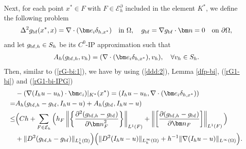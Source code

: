 \documentclass[1996/10/24]{amsart}
\theoremstyle{definition}
\numberwithin{equation}{section}
\begin{document}
Next, for each point $x^{\ast}\in F$ with $F\in \mathcal{E}_h^{\partial}$ included in the element $K^{\ast}$, we define the following problem
\begin{align}
\Delta^2g_{{\rm bf}}(x^{\ast},x)=\nabla\cdot({\bm e}_i\delta_{h,x^{\ast}})\quad {\rm in}~\Omega,\quad g_{{\rm bf}}=\nabla g_{{\rm bf}}\cdot{\bm n}=0\quad {\rm on}~\partial\Omega,\label{rG1-bi}
\end{align}
and let $g_{{\rm bf},h}\in S_h$ be its $C^0$-IP approximation such that
\begin{align}
A_h(g_{{\rm bf},h},v_h)=(\nabla\cdot({\bm e}_i\delta_{h,x^{\ast}}),v_h),\quad \forall v_h\in S_h.\label{rG1-bi-IPG}
\end{align}
Then, similar to (\ref{rG-bi:1}), we have by using (\ref{ddd:2}), Lemma \ref{dfp-bi}, (\ref{rG1-bi}) and (\ref{rG1-bi-IPG})
\begin{align}
&-(\nabla (I_hu-u_h)\cdot{\bm e}_i)|_{K^{\ast}}(x^{\ast})=(I_hu-u_h,\nabla\cdot({\bm e}_i\delta_{h,x^{\ast}}))\nonumber\\
=&A_h(g_{{\rm bf},h}-g_{{\rm bf}},I_hu-u)+A_h(g_{{\rm bf}},I_hu-u)\label{rG1-bi:1}\\
\leq&\Big(Ch+\sum_{F\in\mathcal{E}_h}\Big(h_F\left\|\left\{\frac{\partial^2(g_{{\rm bf},h}-g_{{\rm bf}})}{\partial{\bm n}_F^2}\right\}\right\|_{L^1(F)}+\left\|\left[\frac{\partial(g_{{\rm bf},h}-g_{{\rm bf}})}{\partial{\bm n}_F}\right]\right\|_{L^1(F)}\Big)\nonumber\\
&+\|D^2(g_{{\rm bf},h}-g_{{\rm bf}})\|_{L_h^1(\Omega)}\Big)\Big(\|D^2(I_hu-u)\|_{L_h^{\infty}(\Omega)}+h^{-1}\|\nabla(I_hu-u)\|_{L^{\infty}(\Omega)}\Big).\nonumber
\end{align}
\end{document}
